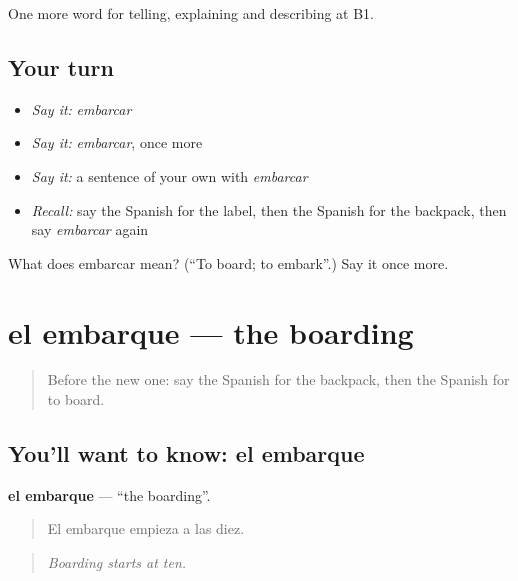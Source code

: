 \begin{grammarlens}[title={What you've built}]
One more word for telling, explaining and describing at B1.
\end{grammarlens}

\subsection*{Your turn}
\begin{itemize}
\raggedright
  \item \emph{Say it:} \emph{embarcar}
  \item \emph{Say it:} \emph{embarcar}, once more
  \item \emph{Say it:} a sentence of your own with \emph{embarcar}
  \item \emph{Recall:} say the Spanish for the label, then the Spanish for the backpack, then say \emph{embarcar} again
\end{itemize}

\begin{tcolorbox}[breakable,colback=teal!4,colframe=teal!35!black,title={Before you move on}]
What does embarcar mean? (\textquotedblleft{}To board; to embark\textquotedblright{}.) Say it once more.
\end{tcolorbox}
\section[el embarque]{el embarque — the boarding}

\label{lesson:ES-C653-embarque}



\begin{quote}
Before the new one: say the Spanish for the backpack, then the Spanish for to board.
\end{quote}

\subsection*{You'll want to know: el embarque}
\textbf{el embarque} — \textquotedblleft{}the boarding\textquotedblright{}.

\begin{quote}
El embarque empieza a las diez.
\end{quote}

\begin{quote}
\emph{Boarding starts at ten.}
\end{quote}

